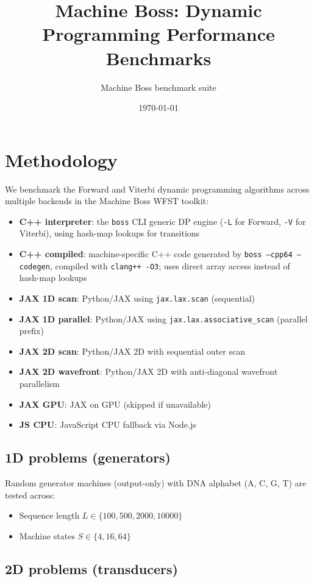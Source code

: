 \documentclass[11pt]{article}
\title{Machine Boss: Dynamic Programming Performance Benchmarks}
\author{Machine Boss benchmark suite}
\date{\today}
\begin{document}
\maketitle

\section{Methodology}

We benchmark the Forward and Viterbi dynamic programming algorithms across multiple
backends in the Machine Boss WFST toolkit:

\begin{itemize}
  \item \textbf{C++ interpreter}: the \texttt{boss} CLI generic DP engine (\texttt{-L} for Forward, \texttt{-V} for Viterbi), using hash-map lookups for transitions
  \item \textbf{C++ compiled}: machine-specific C++ code generated by \texttt{boss --cpp64 --codegen}, compiled with \texttt{clang++ -O3}; uses direct array access instead of hash-map lookups
  \item \textbf{JAX 1D scan}: Python/JAX using \texttt{jax.lax.scan} (sequential)
  \item \textbf{JAX 1D parallel}: Python/JAX using \texttt{jax.lax.associative\_scan} (parallel prefix)
  \item \textbf{JAX 2D scan}: Python/JAX 2D with sequential outer scan
  \item \textbf{JAX 2D wavefront}: Python/JAX 2D with anti-diagonal wavefront parallelism
  \item \textbf{JAX GPU}: JAX on GPU (skipped if unavailable)
  \item \textbf{JS CPU}: JavaScript CPU fallback via Node.js
\end{itemize}

\subsection{1D problems (generators)}

Random generator machines (output-only) with DNA alphabet (A, C, G, T) are tested across:
\begin{itemize}
  \item Sequence length $L \in \{100, 500, 2000, 10000\}$
  \item Machine states $S \in \{4, 16, 64\}$
\end{itemize}

\subsection{2D problems (transducers)}
\end{document}
